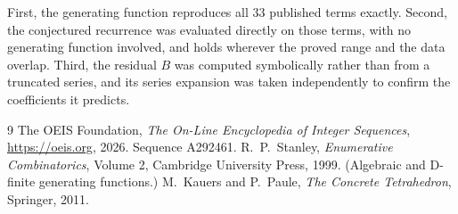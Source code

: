 \documentclass[11pt,a4paper]{article}
\theoremstyle{plain}
\theoremstyle{definition}
\begin{document}
First, the generating function reproduces all $33$ published terms exactly. Second,
the conjectured recurrence was evaluated directly on those terms, with no generating function
involved, and holds wherever the proved range and the data overlap. Third, the residual $B$ was
computed symbolically rather than from a truncated series, and its series expansion was taken
independently to confirm the coefficients it predicts.

\begin{thebibliography}{9}
 The OEIS Foundation, \emph{The On-Line Encyclopedia of Integer Sequences},
\url{https://oeis.org}, 2026. Sequence A292461.
 R.~P.~Stanley, \emph{Enumerative Combinatorics}, Volume 2, Cambridge
University Press, 1999. (Algebraic and D-finite generating functions.)
 M.~Kauers and P.~Paule, \emph{The Concrete Tetrahedron}, Springer, 2011.
\end{thebibliography}
\end{document}
